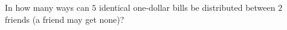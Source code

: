 In how many ways can $5$ identical one-dollar bills be distributed between $2$ friends (a friend may get none)?
